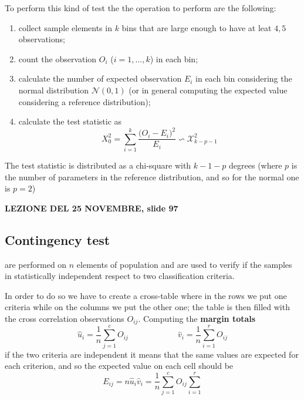 	To perform this kind of test the the operation to perform are the following:
	\begin{enumerate}
		\item collect sample elements in $k$ bins that are large enough to have at leat $4,5$ observations;
		\item count the observation $O_i$ ($i=1,\dots,k$) in each bin;
		\item calculate the number of expected observation $E_i$ in each bin considering the normal distribution $\mathcal N(0,1)$ (or in general computing the expected value considering  a reference distribution);
		\item calculate the test statistic as
		\begin{equation}
			X_0^2  = \sum_{i=1}^k \frac{\big(O_i-E_i\big)^2}{E_i} \backsim \mathcal X_{k-p-1}^2
		\end{equation}
	\end{enumerate}
	The test statistic is distributed as a chi-square with $k-1-p$ degrees (where $p$ is the number of parameters in the reference distribution, and so for the normal one is $p=2$)
	













	
	\vspace{3cm}
	\textbf{ LEZIONE DEL 25 NOVEMBRE, slide 97 }
	
	
\subsection{Contingency test}
	 are performed on $n$ elements of population and are used to verify if the samples in statistically independent respect to two classification criteria.
	
	In order to do so we have to create a cross-table where in the rows we put one criteria while on the columns we put the other one; the table is then filled with the cross correlation observations $O_{ij}$. Computing the \textbf{margin totals}
	\[ \hat u_i = \frac 1 n \sum_{j=1}^{c} O_{ij} \qquad \qquad \qquad \hat v_i = \frac 1 n \sum_{i=1}^{r} O_{ij} \]	
	if the two criteria are independent it means that the same values are expected for each criterion, and so the expected value on each cell should be
	\[ E_{ij} = n \hat u_i \hat v_i = \frac 1 n  \sum_{j=1}^{c} O_{ij} \sum_{i=1}^{r} \]
	
